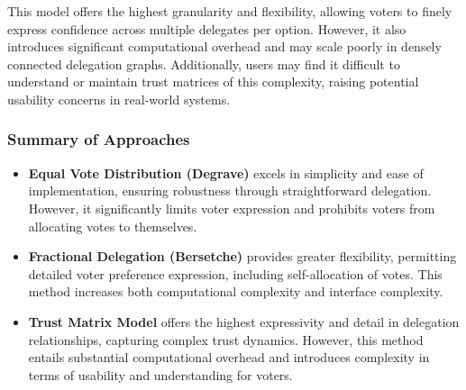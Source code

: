 

This model offers the highest granularity and flexibility, allowing voters to finely express confidence across multiple delegates per option. However, it also introduces significant computational overhead and may scale poorly in densely connected delegation graphs. Additionally, users may find it difficult to understand or maintain trust matrices of this complexity, raising potential usability concerns in real-world systems.

\subsubsection*{Summary of Approaches}

\begin{itemize}
  \item \textbf{Equal Vote Distribution (Degrave)} excels in simplicity and ease of implementation, ensuring robustness through straightforward delegation. However, it significantly limits voter expression and prohibits voters from allocating votes to themselves.
  \item \textbf{Fractional Delegation (Bersetche)} provides greater flexibility, permitting detailed voter preference expression, including self-allocation of votes. This method increases both computational complexity and interface complexity.
  \item \textbf{Trust Matrix Model} offers the highest expressivity and detail in delegation relationships, capturing complex trust dynamics. However, this method entails substantial computational overhead and introduces complexity in terms of usability and understanding for voters.
\end{itemize}

